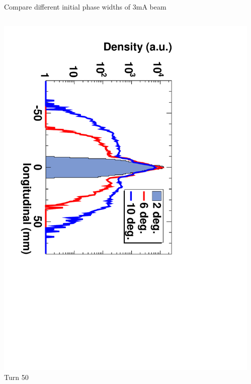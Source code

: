 \documentclass[xcolor=pdftex,table,10pt,yellow,mathserif]{beamer}
\begin{document}
{\begin{block}{Compare different initial phase widths of 3mA beam}
\begin{columns}
\begin{column}{3.0cm}
      \includegraphics[angle=90,width=\linewidth]{figures/Theta-Turn-50.pdf} \\
      \center Turn 50
    \end{column}
    \begin{column}{3.0cm}

\end{column}
\end{columns}
\end{block}}
\end{document}
